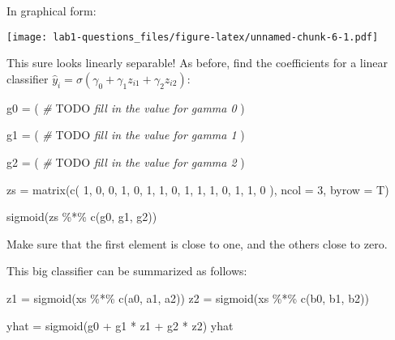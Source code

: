 \documentclass[
]{article}
\newenvironment{Shaded}{\begin{snugshade}}{\end{snugshade}}
\newcommand{\AlertTok}[1]{\textcolor[rgb]{0.94,0.16,0.16}{#1}}
\newcommand{\AttributeTok}[1]{\textcolor[rgb]{0.77,0.63,0.00}{#1}}
\newcommand{\CommentTok}[1]{\textcolor[rgb]{0.56,0.35,0.01}{\textit{#1}}}
\newcommand{\DecValTok}[1]{\textcolor[rgb]{0.00,0.00,0.81}{#1}}
\newcommand{\FunctionTok}[1]{\textcolor[rgb]{0.00,0.00,0.00}{#1}}
\newcommand{\NormalTok}[1]{#1}
\newcommand{\OtherTok}[1]{\textcolor[rgb]{0.56,0.35,0.01}{#1}}
\newcommand{\SpecialCharTok}[1]{\textcolor[rgb]{0.00,0.00,0.00}{#1}}
\begin{document}
In graphical form:

\texttt{[image: lab1-questions\_files/figure-latex/unnamed-chunk-6-1.pdf]}

This sure looks linearly separable! As before, find the coefficients for
a linear classifier
\(\hat{y}_i=\sigma\left(\gamma_0+\gamma_1z_{i1}+\gamma_2z_{i2}\right)\):

\begin{Shaded}
\begin{Highlighting}[]
\NormalTok{g0 }\OtherTok{=}\NormalTok{ (}
  \CommentTok{\# }\AlertTok{TODO}\CommentTok{ fill in the value for gamma 0}
\NormalTok{)}

\NormalTok{g1 }\OtherTok{=}\NormalTok{ (}
  \CommentTok{\# }\AlertTok{TODO}\CommentTok{ fill in the value for gamma 1}
\NormalTok{)}

\NormalTok{g2 }\OtherTok{=}\NormalTok{ (}
  \CommentTok{\# }\AlertTok{TODO}\CommentTok{ fill in the value for gamma 2}
\NormalTok{)}

\NormalTok{zs }\OtherTok{=} \FunctionTok{matrix}\NormalTok{(}\FunctionTok{c}\NormalTok{(}
  \DecValTok{1}\NormalTok{, }\DecValTok{0}\NormalTok{, }\DecValTok{0}\NormalTok{,}
  \DecValTok{1}\NormalTok{, }\DecValTok{0}\NormalTok{, }\DecValTok{1}\NormalTok{,}
  \DecValTok{1}\NormalTok{, }\DecValTok{0}\NormalTok{, }\DecValTok{1}\NormalTok{,}
  \DecValTok{1}\NormalTok{, }\DecValTok{1}\NormalTok{, }\DecValTok{0}\NormalTok{,}
  \DecValTok{1}\NormalTok{, }\DecValTok{1}\NormalTok{, }\DecValTok{0}
\NormalTok{), }\AttributeTok{ncol =} \DecValTok{3}\NormalTok{, }\AttributeTok{byrow =}\NormalTok{ T)}

\FunctionTok{sigmoid}\NormalTok{(zs }\SpecialCharTok{\%*\%} \FunctionTok{c}\NormalTok{(g0, g1, g2))}
\end{Highlighting}
\end{Shaded}

Make sure that the first element is close to one, and the others close
to zero.

This big classifier can be summarized as follows:

\begin{Shaded}
\begin{Highlighting}[]
\NormalTok{z1 }\OtherTok{=} \FunctionTok{sigmoid}\NormalTok{(xs }\SpecialCharTok{\%*\%} \FunctionTok{c}\NormalTok{(a0, a1, a2))}
\NormalTok{z2 }\OtherTok{=} \FunctionTok{sigmoid}\NormalTok{(xs }\SpecialCharTok{\%*\%} \FunctionTok{c}\NormalTok{(b0, b1, b2))}

\NormalTok{yhat }\OtherTok{=} \FunctionTok{sigmoid}\NormalTok{(g0 }\SpecialCharTok{+}\NormalTok{ g1 }\SpecialCharTok{*}\NormalTok{ z1 }\SpecialCharTok{+}\NormalTok{ g2 }\SpecialCharTok{*}\NormalTok{ z2)}
\NormalTok{yhat}
\end{Highlighting}
\end{Shaded}
\end{document}
